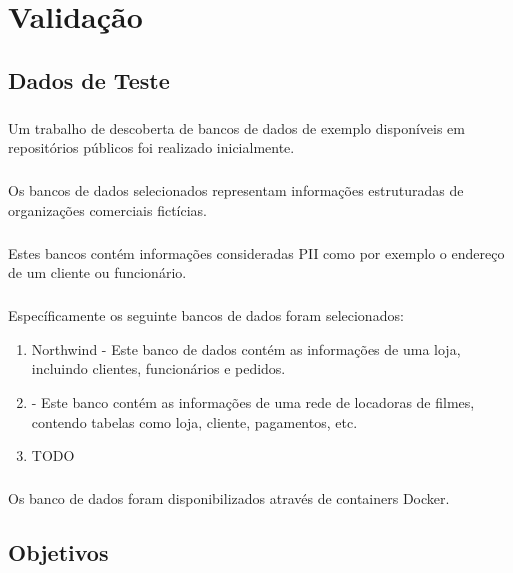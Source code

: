 \chapter{Validação}
\label{cap5}

\section{Dados de Teste}


\paragraph{} Um trabalho de descoberta de bancos de dados de exemplo disponíveis em repositórios públicos foi realizado inicialmente.

\paragraph{} Os bancos de dados selecionados representam informações estruturadas de organizações comerciais fictícias.

\paragraph{} Estes bancos contém informações consideradas PII como por exemplo o endereço de um cliente ou funcionário.

\paragraph{} Específicamente os seguinte bancos de dados foram selecionados:

\begin{enumerate}
    \item Northwind\cite{northwindpg} - Este banco de dados contém as informações de uma loja, incluindo clientes, funcionários e pedidos.
    \item   \cite{sakila} - Este banco contém as informações de uma rede de locadoras de filmes, contendo tabelas como loja, cliente, pagamentos, etc.
    \item TODO
\end{enumerate}

\paragraph{} Os banco de dados foram disponibilizados através de containers Docker.

\section{Objetivos}

